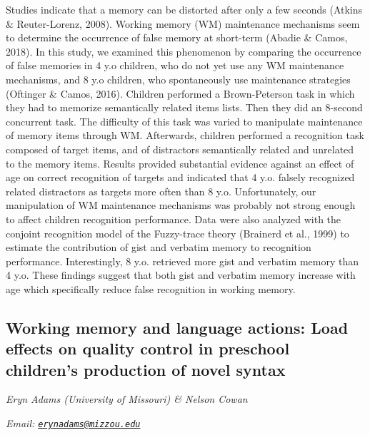 \documentclass[12pt,]{book}
\begin{document}
Studies indicate that a memory can be distorted after only a few seconds (Atkins \& Reuter-Lorenz, 2008). Working memory (WM) maintenance mechanisms seem to determine the occurrence of false memory at short-term (Abadie \& Camos, 2018). In this study, we examined this phenomenon by comparing the occurrence of false memories in 4 y.o children, who do not yet use any WM maintenance mechanisms, and 8 y.o children, who spontaneously use maintenance strategies (Oftinger \& Camos, 2016). Children performed a Brown-Peterson task in which they had to memorize semantically related items lists. Then they did an 8-second concurrent task. The difficulty of this task was varied to manipulate maintenance of memory items through WM. Afterwards, children performed a recognition task composed of target items, and of distractors semantically related and unrelated to the memory items. Results provided substantial evidence against an effect of age on correct recognition of targets and indicated that 4 y.o. falsely recognized related distractors as targets more often than 8 y.o. Unfortunately, our manipulation of WM maintenance mechanisms was probably not strong enough to affect children recognition performance. Data were also analyzed with the conjoint recognition model of the Fuzzy-trace theory (Brainerd et al., 1999) to estimate the contribution of gist and verbatim memory to recognition performance. Interestingly, 8 y.o. retrieved more gist and verbatim memory than 4 y.o. These findings suggest that both gist and verbatim memory increase with age which specifically reduce false recognition in working memory.

\hypertarget{working-memory-and-language-actions-load-effects-on-quality-control-in-preschool-childrens-production-of-novel-syntax}{%
\subsection{Working memory and language actions: Load effects on quality control in preschool children's production of novel syntax}\label{working-memory-and-language-actions-load-effects-on-quality-control-in-preschool-childrens-production-of-novel-syntax}}

\emph{Eryn Adams (University of Missouri) \& Nelson Cowan}

\emph{Email: \href{mailto:erynadams@mizzou.edu}{\nolinkurl{erynadams@mizzou.edu}}}
\end{document}

